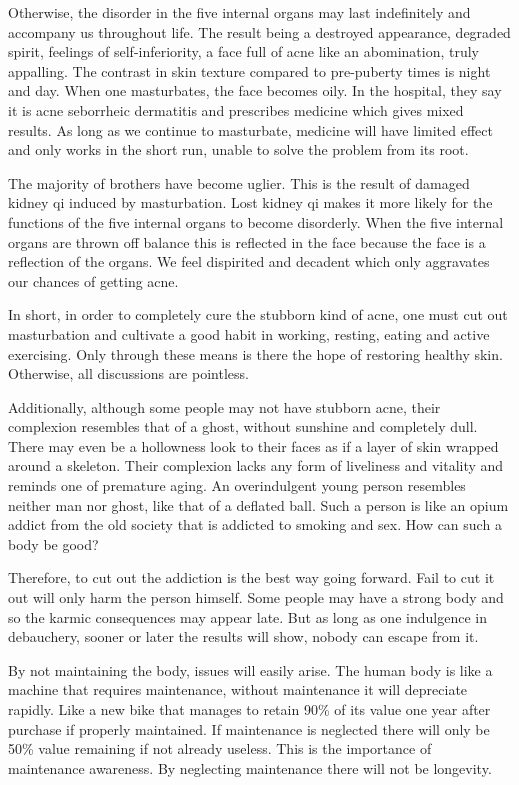 \documentclass[
]{book}
\begin{document}
Otherwise, the disorder in the five internal organs may last indefinitely and accompany us throughout life. The result being a destroyed appearance, degraded spirit, feelings of self-inferiority, a face full of acne like an abomination, truly appalling. The contrast in skin texture compared to pre-puberty times is night and day. When one masturbates, the face becomes oily. In the hospital, they say it is acne seborrheic dermatitis and prescribes medicine which gives mixed results. As long as we continue to masturbate, medicine will have limited effect and only works in the short run, unable to solve the problem from its root.

The majority of brothers have become uglier. This is the result of damaged kidney qi induced by masturbation. Lost kidney qi makes it more likely for the functions of the five internal organs to become disorderly. When the five internal organs are thrown off balance this is reflected in the face because the face is a reflection of the organs. We feel dispirited and decadent which only aggravates our chances of getting acne.

In short, in order to completely cure the stubborn kind of acne, one must cut out masturbation and cultivate a good habit in working, resting, eating and active exercising. Only through these means is there the hope of restoring healthy skin. Otherwise, all discussions are pointless.

Additionally, although some people may not have stubborn acne, their complexion resembles that of a ghost, without sunshine and completely dull. There may even be a hollowness look to their faces as if a layer of skin wrapped around a skeleton. Their complexion lacks any form of liveliness and vitality and reminds one of premature aging. An overindulgent young person resembles neither man nor ghost, like that of a deflated ball. Such a person is like an opium addict from the old society that is addicted to smoking and sex. How can such a body be good?

Therefore, to cut out the addiction is the best way going forward. Fail to cut it out will only harm the person himself. Some people may have a strong body and so the karmic consequences may appear late. But as long as one indulgence in debauchery, sooner or later the results will show, nobody can escape from it.

By not maintaining the body, issues will easily arise. The human body is like a machine that requires maintenance, without maintenance it will depreciate rapidly. Like a new bike that manages to retain 90\% of its value one year after purchase if properly maintained. If maintenance is neglected there will only be 50\% value remaining if not already useless. This is the importance of maintenance awareness. By neglecting maintenance there will not be longevity.
\end{document}
